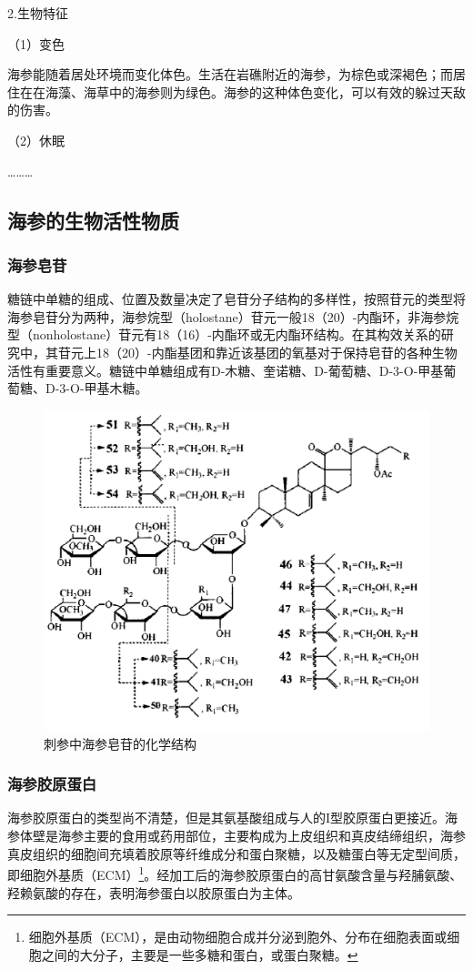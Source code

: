 \documentclass{QITthesis}
\begin{document}
2.生物特征

（1）变色

海参能随着居处环境而变化体色。生活在岩礁附近的海参，为棕色或深褐色；而居住在在海藻、海草中的海参则为绿色。海参的这种体色变化，可以有效的躲过天敌的伤害。

（2）休眠

\dots\dots\dots

\subsection{海参的生物活性物质}
\subsubsection{海参皂苷}

糖链中单糖的组成、位置及数量决定了皂苷分子结构的多样性，按照苷元的类型将海参皂苷分为两种，海参烷型（holostane）苷元一般18（20）-内酯环，非海参烷型（nonholostane）苷元有18（16）-内酯环或无内酯环结构。在其构效关系的研究中，其苷元上18（20）-内酯基团和靠近该基团的氧基对于保持皂苷的各种生物活性有重要意义。糖链中单糖组成有D-木糖、奎诺糖、D-葡萄糖、D-3-O-甲基葡萄糖、D-3-O-甲基木糖。

\begin{figure}[H]
    \centering
    \includegraphics[width=.5\textwidth]{example_figures/图片2.png}
    \caption{刺参中海参皂苷的化学结构}
\end{figure}

\subsubsection{海参胶原蛋白}

海参胶原蛋白的类型尚不清楚，但是其氨基酸组成与人的I型胶原蛋白更接近。海参体壁是海参主要的食用或药用部位，主要构成为上皮组织和真皮结缔组织，海参真皮组织的细胞间充填着胶原等纤维成分和蛋白聚糖，以及糖蛋白等无定型间质，即细胞外基质（ECM）\footnote{细胞外基质（ECM），是由动物细胞合成并分泌到胞外、分布在细胞表面或细胞之间的大分子，主要是一些多糖和蛋白，或蛋白聚糖。}。经加工后的海参胶原蛋白的高甘氨酸含量与羟脯氨酸、羟赖氨酸的存在，表明海参蛋白以胶原蛋白为主体。
\end{document}

